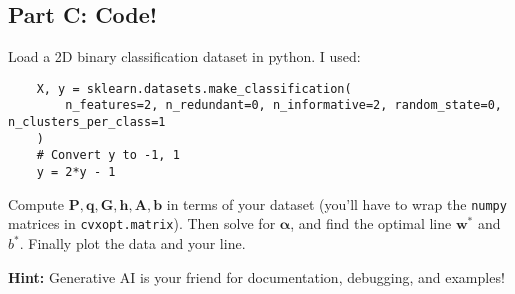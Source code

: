 \documentclass{article}
\begin{document}
\subsection*{Part C: Code!}

Load a 2D binary classification dataset in python.
I used:

\begin{verbatim}
    X, y = sklearn.datasets.make_classification(
        n_features=2, n_redundant=0, n_informative=2, random_state=0, n_clusters_per_class=1
    )
    # Convert y to -1, 1
    y = 2*y - 1
\end{verbatim}

Compute $\mathbf{P, q, G, h, A, b}$ in terms of your dataset (you'll have to wrap the \texttt{numpy} matrices in \texttt{cvxopt.matrix}).
Then solve for $\boldsymbol{\alpha}$, and find the optimal line $\mathbf{w}^*$ and $b^*$.
Finally plot the data and your line.

\textbf{Hint:} Generative AI is your friend for documentation, debugging, and examples!
\end{document}
